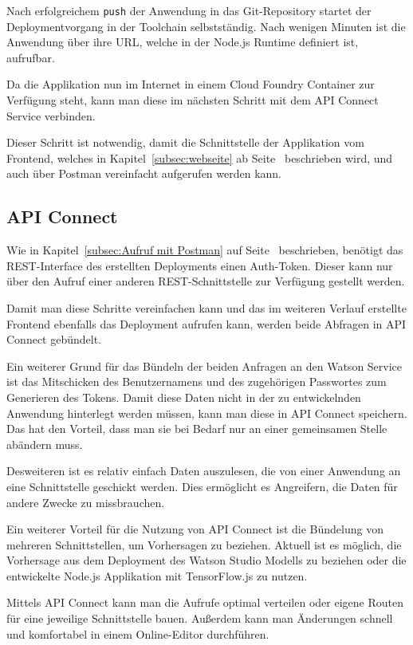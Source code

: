 Nach erfolgreichem \texttt{push} der Anwendung in das Git-Repository startet der Deploymentvorgang in der Toolchain
selbstständig. Nach wenigen Minuten ist die Anwendung über ihre URL, welche in der Node.js Runtime definiert ist,
aufrufbar.

Da die Applikation nun im Internet in einem Cloud Foundry Container zur Verfügung steht, kann man diese im nächsten
Schritt mit dem API Connect Service verbinden.

Dieser Schritt ist notwendig, damit die Schnittstelle der Applikation vom Frontend, welches in
Kapitel~\ref{subsec:webseite} ab Seite~\pageref{subsec:webseite} beschrieben wird, und auch über Postman vereinfacht
aufgerufen werden kann.

\subsection{API Connect}
\label{subsec:apiconnect}
Wie in Kapitel~\ref{subsec:Aufruf mit Postman} auf Seite~\pageref{subsec:Aufruf mit Postman} beschrieben, benötigt das
REST-Interface des erstellten Deployments einen Auth-Token. Dieser kann nur über den Aufruf einer anderen
REST-Schnittstelle zur Verfügung gestellt werden.

Damit man diese Schritte vereinfachen kann und das im weiteren Verlauf erstellte Frontend ebenfalls das Deployment
aufrufen kann, werden beide Abfragen in API Connect gebündelt.

Ein weiterer Grund für das Bündeln der beiden Anfragen an den Watson Service ist das Mitschicken des Benutzernamens und
des zugehörigen Passwortes zum Generieren des Tokens. Damit diese Daten nicht in der zu entwickelnden Anwendung
hinterlegt werden müssen, kann man diese in API Connect speichern. Das hat den Vorteil, dass man sie bei Bedarf nur an
einer gemeinsamen Stelle abändern muss.

Desweiteren ist es relativ einfach Daten auszulesen, die von einer Anwendung an eine Schnittstelle geschickt werden.
Dies ermöglicht es Angreifern, die Daten für andere Zwecke zu missbrauchen.

Ein weiterer Vorteil für die Nutzung von API Connect ist die Bündelung von mehreren Schnittstellen, um Vorhersagen zu
beziehen. Aktuell ist es möglich, die Vorhersage aus dem Deployment des Watson Studio Modells zu beziehen oder die
entwickelte Node.js Applikation mit TensorFlow.js zu nutzen.

Mittels API Connect kann man die Aufrufe optimal verteilen oder eigene Routen für eine jeweilige Schnittstelle bauen.
Außerdem kann man Änderungen schnell und komfortabel in einem Online-Editor durchführen.

